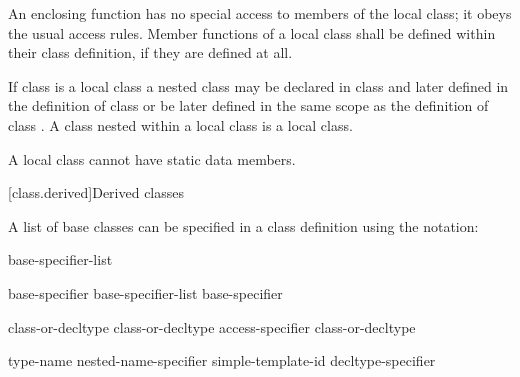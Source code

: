 \pnum
An enclosing function has no special access to members of the local
class; it obeys the usual access rules.
%
Member functions of a local class shall be defined within their class
definition, if they are defined at all.

\pnum
{}%
If class  is a local class a nested class  may be
declared in class  and later defined in the definition of class
 or be later defined in the same scope as the definition of
class .
%
A class nested within
a local class is a local class.

\pnum
{}%
\begin{note}
A local class cannot have static data members.
\end{note}

[class.derived]{Derived classes}%


\pnum
{}%
%
%
A list of base classes can be specified in a class definition using
the notation:

\begin{bnf}
\br
    \terminal{:} base-specifier-list
\end{bnf}


\begin{bnf}
\br
    base-specifier \br
    base-specifier-list \terminal{,} base-specifier 
\end{bnf}

\begin{bnf}
\br
     class-or-decltype\br
       class-or-decltype\br
     access-specifier  class-or-decltype
\end{bnf}

\begin{bnf}
\br
     type-name\br
    nested-name-specifier  simple-template-id\br
    decltype-specifier
\end{bnf}

